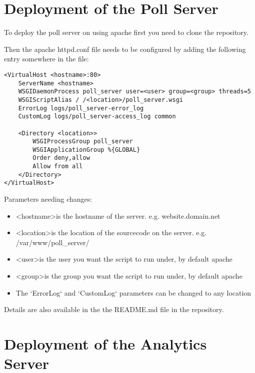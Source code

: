 \chapter{Deployment of the Poll Server} \label{Chapter:Deployment Poll Server}

To deploy the poll server on using apache first you need to clone the repository.

Then the apache httpd.conf file needs to be configured by adding the following entry somewhere in the file:

\begin{lstlisting}[caption={\label{code:apacheConfig} Apache configuration}]
<VirtualHost <hostname>:80>
	ServerName <hostname>
	WSGIDaemonProcess poll_server user=<user> group=<group> threads=5
	WSGIScriptAlias / /<location>/poll_server.wsgi
	ErrorLog logs/poll_server-error_log
	CustomLog logs/poll_server-access_log common

	<Directory <location>>
		WSGIProcessGroup poll_server
		WSGIApplicationGroup %{GLOBAL}
		Order deny,allow
		Allow from all
	</Directory>
</VirtualHost>
\end{lstlisting}

Parameters needing changes:

\begin{itemize}
\item \textless hostname\textgreater is the hostname of the server. e.g. website.domain.net
\item \textless location\textgreater is the location of the sourcecode on the server. e.g. /var/www/poll\_server/
\item \textless user\textgreater is the user you want the script to run under, by default apache
\item \textless group\textgreater is the group you want the script to run under, by default apache
\item The `ErrorLog` and `CustomLog` parameters can be changed to any location

\end{itemize}

Details are also available in the the README.md file in the repository.

\chapter{Deployment of the Analytics Server} \label{Chapter:Deployment Analytics Server}

